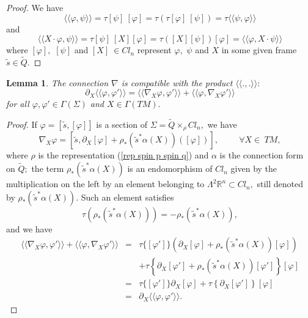 \documentclass{amsart}
\newtheorem{lem}{Lemma}[section]
\begin{document}
\begin{proof}
We have
$$\langle\langle \varphi,\psi\rangle\rangle=\tau[\psi]\ [\varphi]=\tau(\tau[\varphi]\ [\psi])=\tau\langle\langle\psi,\varphi\rangle\rangle$$
and
$$\langle\langle X\cdot\varphi,\psi\rangle\rangle=\tau[\psi]\ [X][\varphi]=\tau([X][\psi])[\varphi]=\langle\langle\varphi,X\cdot \psi\rangle\rangle$$
where $[\varphi],$ $[\psi]$ and $[X]\ \in Cl_n$ represent $\varphi,$ $\psi$ and $X$ in some given frame $\tilde{s}\in\tilde{Q}.$
\end{proof}
\begin{lem}
The connection $\nabla$ is compatible with the product $\langle\langle.,.\rangle\rangle:$
$$\partial_X\langle\langle\varphi,\varphi'\rangle\rangle=\langle\langle\nabla_X\varphi,\varphi'\rangle\rangle+\langle\langle\varphi,\nabla_X\varphi'\rangle\rangle$$
for all $\varphi,\varphi'\in\Gamma(\Sigma)$ and $X\in\Gamma(TM).$ 
\end{lem}
\begin{proof}
If $\varphi=[\tilde{s},[\varphi]]$ is a section of $\Sigma=\tilde{Q}\times_\rho Cl_n,$ we have
$$\nabla_X\varphi=\left[\tilde{s},\partial_X[\varphi]+\rho_*(\tilde{s}^*\alpha(X))([\varphi])\right],\hspace{1cm}\forall X\in\ TM,$$
where $\rho$ is the representation (\ref{rep spin p spin q}) and $\alpha$ is the connection form on $\tilde{Q};$ the term $\rho_*(\tilde{s}^*\alpha(X))$ is an endomorphism of $Cl_n$ given by the multiplication on the left by an element belonging to $\Lambda^2{\mathbb{R}}^n\subset Cl_n,$ still denoted by  $\rho_*(\tilde{s}^*\alpha(X)).$ Such an element satisfies
$$\tau\left( \rho_*(\tilde{s}^*\alpha(X))\right)=-\rho_*(\tilde{s}^*\alpha(X)),$$
and we have
\begin{eqnarray*}
\langle\langle\nabla_X\varphi,\varphi'\rangle\rangle+\langle\langle\varphi,\nabla_X\varphi'\rangle\rangle&=&\tau\{[\varphi']\}\left(\partial_X[\varphi]+\rho_*(\tilde{s}^*\alpha(X))[\varphi]\right)\\
&&+\tau\left\{\partial_X[\varphi']+\rho_*(\tilde{s}^*\alpha(X))[\varphi']\right\}[\varphi]\\
&=&\tau\{[\varphi']\}\partial_X[\varphi]+\tau\left\{\partial_X[\varphi']\right\}[\varphi]\\
&=&\partial_X\langle\langle\varphi,\varphi'\rangle\rangle.
\end{eqnarray*}
\end{proof}
\end{document}
